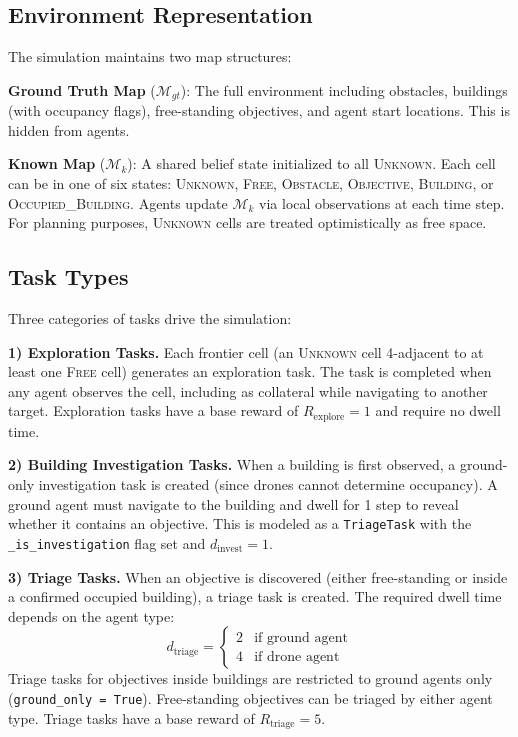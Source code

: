 \documentclass[conference]{IEEEtran}
\begin{document}
\subsection{Environment Representation}

The simulation maintains two map structures:

\textbf{Ground Truth Map} ($\mathcal{M}_{gt}$): The full environment including obstacles, buildings (with occupancy flags), free-standing objectives, and agent start locations. This is hidden from agents.

\textbf{Known Map} ($\mathcal{M}_{k}$): A shared belief state initialized to all \textsc{Unknown}. Each cell can be in one of six states: \textsc{Unknown}, \textsc{Free}, \textsc{Obstacle}, \textsc{Objective}, \textsc{Building}, or \textsc{Occupied\_Building}. Agents update $\mathcal{M}_{k}$ via local observations at each time step. For planning purposes, \textsc{Unknown} cells are treated optimistically as free space.

\subsection{Task Types}

Three categories of tasks drive the simulation:

\textbf{1) Exploration Tasks.} Each frontier cell (an \textsc{Unknown} cell 4-adjacent to at least one \textsc{Free} cell) generates an exploration task. The task is completed when any agent observes the cell, including as collateral while navigating to another target. Exploration tasks have a base reward of $R_{\text{explore}} = 1$ and require no dwell time.

\textbf{2) Building Investigation Tasks.} When a building is first observed, a ground-only investigation task is created (since drones cannot determine occupancy). A ground agent must navigate to the building and dwell for 1 step to reveal whether it contains an objective. This is modeled as a \texttt{TriageTask} with the \texttt{\_is\_investigation} flag set and $d_{\text{invest}} = 1$.

\textbf{3) Triage Tasks.} When an objective is discovered (either free-standing or inside a confirmed occupied building), a triage task is created. The required dwell time depends on the agent type:
\begin{equation}
    d_{\text{triage}} = \begin{cases} 2 & \text{if ground agent} \\ 4 & \text{if drone agent} \end{cases}
\end{equation}
Triage tasks for objectives inside buildings are restricted to ground agents only (\texttt{ground\_only = True}). Free-standing objectives can be triaged by either agent type. Triage tasks have a base reward of $R_{\text{triage}} = 5$.
\end{document}
